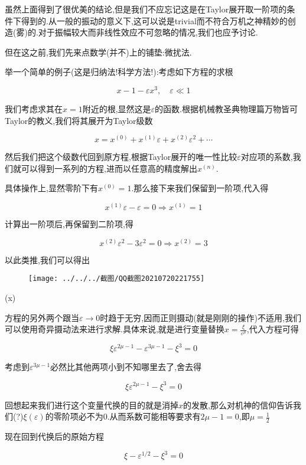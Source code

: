\documentclass[UTF8]{article}
\begin{document}
	虽然上面得到了很优美的结论,但是我们不应忘记这是在Taylor展开取一阶项的条件下得到的.从一般的振动的意义下,这可以说是trivial而不符合万机之神精妙的创造(雾)的.对于振幅较大而非线性效应不可忽略的情况,我们也应予讨论.
	
	但在这之前,我们先来点数学(并不)上的铺垫:微扰法.
	
	举一个简单的例子(这是归纳法!科学方法!):考虑如下方程的求根
	
	\[x-1-\varepsilon x^3,\quad\varepsilon\ll1\]
	
	我们考虑求其在$x=1$附近的根,显然这是$\varepsilon$的函数.根据机械教圣典物理篇万物皆可Taylor的教义,我们将其展开为Taylor级数
	
	\[x=x^{(0)}+x^{(1)}\varepsilon+x^{(2)}\varepsilon^2+\cdots\]

	然后我们把这个级数代回到原方程,根据Taylor展开的唯一性比较$\varepsilon$对应项的系数,我们就可以得到一系列的方程,进而以任意高的精度解出$x^{(n)}$.
	
	具体操作上,显然零阶下有$x^{(0)}=1$.那么接下来我们保留到一阶项,代入得
	
	\[x^{(1)}\varepsilon-\varepsilon=0 \Rightarrow x^{(1)}=1\]
	
	计算出一阶项后,再保留到二阶项,得
	
	\[x^{(2)}\varepsilon^2-3\varepsilon^2=0\Rightarrow x^{(2)}=3\]
	
	以此类推,我们可以得出

	\begin{figure}[H]
		\centering
		\texttt{[image: ../../../截图/QQ截图20210720221755]}
		\label{fig:qq20210720221755}
	\end{figure}
	
	(x)
	
	方程的另外两个跟当$\varepsilon\to 0$时趋于无穷,因而正则摄动(就是刚刚的操作)不适用,我们可以使用奇异摄动法来进行求解.具体来说,就是进行变量替换$x=\frac{\xi}{\varepsilon^\mu}$,代入方程可得
	
	\[\xi\varepsilon^{2\mu-1}-\varepsilon^{3\mu-1}-\xi^3=0\]
	
	考虑到$\varepsilon^{3\mu-1}$必然比其他两项小到不知哪里去了,舍去得
	
	\[\xi\varepsilon^{2\mu-1}-\xi^3=0\]
	
	回想起来我们进行这个变量代换的目的就是消掉$x$的发散,那么对机神的信仰告诉我们(?)$\xi(\varepsilon)$的零阶项必不为0.从而系数可能相等要求有$2\mu-1=0$,即$\mu=\frac{1}{2}$
	
	现在回到代换后的原始方程
	
	\[\xi-\varepsilon^{1/2}-\xi^3=0\]
	
\end{document}
